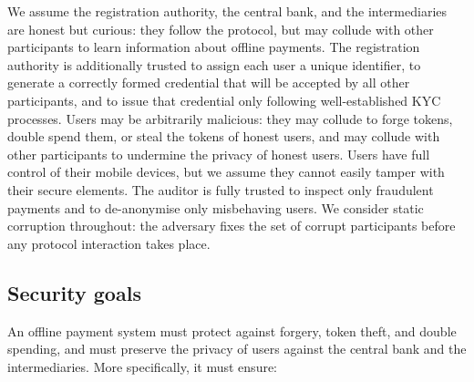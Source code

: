 We assume the registration authority, the central bank, and the intermediaries
are honest but curious: they follow the protocol, but may collude with other
participants to learn information about offline payments.  The registration
authority is additionally trusted to assign each user a unique identifier, to
generate a correctly formed credential that will be accepted by all other
participants, and to issue that credential only following well-established KYC
processes. Users may be arbitrarily malicious: they may collude to forge
tokens, double spend them, or steal the tokens of honest users, and may collude
with other participants to undermine the privacy of honest users. Users have
full control of their mobile devices, but we assume they cannot easily tamper
with their secure elements. The auditor is fully trusted to inspect only
fraudulent payments and to de-anonymise only misbehaving users. We consider
static corruption throughout: the adversary fixes the set of corrupt
participants before any protocol interaction takes place.

\subsection{Security goals}

An offline payment system must protect against forgery, token theft, and double
spending, and must preserve the privacy of users against the central bank and
the intermediaries. More specifically, it must ensure:

